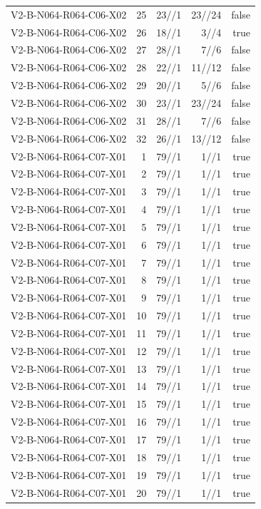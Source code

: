 {\begin{longtable}{lrrrr}
V2-B-N064-R064-C06-X02 & 25 & 23//1 & 23//24 & false \\
V2-B-N064-R064-C06-X02 & 26 & 18//1 & 3//4 & true \\
V2-B-N064-R064-C06-X02 & 27 & 28//1 & 7//6 & false \\
V2-B-N064-R064-C06-X02 & 28 & 22//1 & 11//12 & false \\
V2-B-N064-R064-C06-X02 & 29 & 20//1 & 5//6 & false \\
V2-B-N064-R064-C06-X02 & 30 & 23//1 & 23//24 & false \\
V2-B-N064-R064-C06-X02 & 31 & 28//1 & 7//6 & false \\
V2-B-N064-R064-C06-X02 & 32 & 26//1 & 13//12 & false \\
V2-B-N064-R064-C07-X01 & 1 & 79//1 & 1//1 & true \\
V2-B-N064-R064-C07-X01 & 2 & 79//1 & 1//1 & true \\
V2-B-N064-R064-C07-X01 & 3 & 79//1 & 1//1 & true \\
V2-B-N064-R064-C07-X01 & 4 & 79//1 & 1//1 & true \\
V2-B-N064-R064-C07-X01 & 5 & 79//1 & 1//1 & true \\
V2-B-N064-R064-C07-X01 & 6 & 79//1 & 1//1 & true \\
V2-B-N064-R064-C07-X01 & 7 & 79//1 & 1//1 & true \\
V2-B-N064-R064-C07-X01 & 8 & 79//1 & 1//1 & true \\
V2-B-N064-R064-C07-X01 & 9 & 79//1 & 1//1 & true \\
V2-B-N064-R064-C07-X01 & 10 & 79//1 & 1//1 & true \\
V2-B-N064-R064-C07-X01 & 11 & 79//1 & 1//1 & true \\
V2-B-N064-R064-C07-X01 & 12 & 79//1 & 1//1 & true \\
V2-B-N064-R064-C07-X01 & 13 & 79//1 & 1//1 & true \\
V2-B-N064-R064-C07-X01 & 14 & 79//1 & 1//1 & true \\
V2-B-N064-R064-C07-X01 & 15 & 79//1 & 1//1 & true \\
V2-B-N064-R064-C07-X01 & 16 & 79//1 & 1//1 & true \\
V2-B-N064-R064-C07-X01 & 17 & 79//1 & 1//1 & true \\
V2-B-N064-R064-C07-X01 & 18 & 79//1 & 1//1 & true \\
V2-B-N064-R064-C07-X01 & 19 & 79//1 & 1//1 & true \\
V2-B-N064-R064-C07-X01 & 20 & 79//1 & 1//1 & true \\

\end{longtable}}
